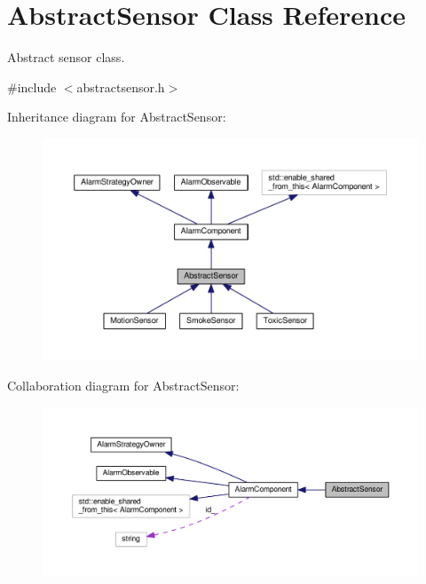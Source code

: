 \hypertarget{classAbstractSensor}{}\section{Abstract\+Sensor Class Reference}
\label{classAbstractSensor}


Abstract sensor class.  




{\ttfamily \#include $<$abstractsensor.\+h$>$}



Inheritance diagram for Abstract\+Sensor\+:\nopagebreak
\begin{figure}[H]
\begin{center}
\leavevmode
\includegraphics[width=350pt]{classAbstractSensor__inherit__graph}
\end{center}
\end{figure}


Collaboration diagram for Abstract\+Sensor\+:\nopagebreak
\begin{figure}[H]
\begin{center}
\leavevmode
\includegraphics[width=350pt]{classAbstractSensor__coll__graph}
\end{center}
\end{figure}

